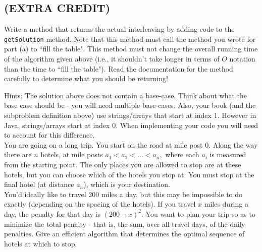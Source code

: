 \documentclass[11pt,answers]{exam}
\begin{document}
\begin{questions}
\begin{parts}
\part [1]{\bf(EXTRA CREDIT)} Write a method that returns the actual interleaving by adding code to the \texttt{getSolution} method.  Note that this method must call the method you wrote for part (a) to ``fill the table".  This method must not change the overall running time of the algorithm given above (i.e., it shouldn't take longer in terms of $O$ notation than the time to ``fill the table").  Read the documentation for the method carefully to determine what you should be returning!
\end{parts}
Hints: The solution above does not contain a base-case.  Think about what the base case should be - you will need multiple base-cases.  Also, your book (and the subproblem definition above) use strings/arrays that start at index 1.  However in Java, strings/arrays start at index 0.  When implementing your code you will need to account for this difference.\\

  
  You are going on a long trip.  You start on the road at mile post 0.  Along
  the way there are $n$ hotels, at mile posts $a_1 < a_2 < \ldots < a_n,$
  where each $a_i$ is measured from the starting point.  The only places you
  are allowed to stop are at these hotels, but you can choose which of the
  hotels you stop at.  You must stop at the final hotel (at distance $a_n$),
  which is your destination.\\

  You'd ideally like to travel 200 miles a day, but this may be impossible to
  do exactly (depending on the spacing of the hotels).  If you travel $x$
  miles during a day, the penalty for that day is $(200-x)^2.$  You want to
  plan your trip so as to minimize the total penalty - that is, the sum, over
  all travel days, of the daily penalties.  Give an efficient algorithm that
  determines the optimal sequence of hotels at which to stop.\\

\end{questions}
\\ 
\end{document}
